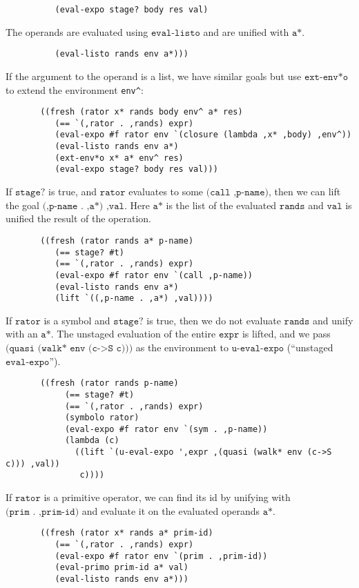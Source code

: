 \documentclass[11pt]{article}
\theoremstyle{definition}
\newcommand{\code}[1]{\texttt{#1}}
\newcommand\tab[1][1cm]{\hspace*{#1}}
\begin{document}
\begin{lstlisting}
          (eval-expo stage? body res val)
\end{lstlisting}
\tab The operands are evaluated using $\code{eval-listo}$ and are unified with $\code{a*}$.
\begin{lstlisting}
          (eval-listo rands env a*)))
\end{lstlisting}
\tab If the argument to the operand is a list, we have similar goals but use $\code{ext-env*o}$ to extend the environment \code{env\^}:
\begin{lstlisting}
       ((fresh (rator x* rands body env^ a* res)
          (== `(,rator . ,rands) expr)
          (eval-expo #f rator env `(closure (lambda ,x* ,body) ,env^))
          (eval-listo rands env a*)
          (ext-env*o x* a* env^ res)
          (eval-expo stage? body res val)))
\end{lstlisting}
\tab If $\code{stage?}$ is true, and $\code{rator}$ evaluates to some $\code{\`(call ,p-name)}$, then we can lift the goal $\code{(,p-name . ,a*) ,val}$. Here $\code{a*}$ is the list of the evaluated $\code{rands}$ and $\code{val}$ is unified the result of the operation.
\begin{lstlisting}
       ((fresh (rator rands a* p-name)
          (== stage? #t)
          (== `(,rator . ,rands) expr)
          (eval-expo #f rator env `(call ,p-name))
          (eval-listo rands env a*)
          (lift `((,p-name . ,a*) ,val))))
\end{lstlisting}
\tab If $\code{rator}$ is a symbol and $\code{stage?}$ is true, then we do not evaluate $\code{rands}$ and unify with an $\code{a*}$. The unstaged evaluation of the entire $\code{expr}$ is lifted, and we pass $\code{(quasi (walk* env (c->S c)))}$ as the environment to $\code{u-eval-expo}$ (``unstaged $\code{eval-expo}$'').
\begin{lstlisting}         
       ((fresh (rator rands p-name)
            (== stage? #t)
            (== `(,rator . ,rands) expr)
            (symbolo rator)
            (eval-expo #f rator env `(sym . ,p-name))
            (lambda (c)
              ((lift `(u-eval-expo ',expr ,(quasi (walk* env (c->S c))) ,val))
               c))))
\end{lstlisting}
\tab If $\code{rator}$ is a primitive operator, we can find its id by unifying with $\code{(prim . ,prim-id)}$ and evaluate it on the evaluated operands $\code{a*}$.
\begin{lstlisting}               
       ((fresh (rator x* rands a* prim-id)
          (== `(,rator . ,rands) expr)
          (eval-expo #f rator env `(prim . ,prim-id))
          (eval-primo prim-id a* val)
          (eval-listo rands env a*)))
\end{lstlisting}
\end{document}
